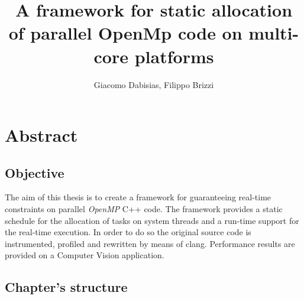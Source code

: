 \documentclass[a4paper,11pt,oneside]{book}
\author{Giacomo Dabisias, Filippo Brizzi}
\title{A framework for static allocation of parallel OpenMp code on multi-core platforms}
\begin{document}
\frontmatter
\tableofcontents

\chapter{Abstract}

\section{Objective}
The aim of this thesis is to create a framework for guaranteeing real-time constraints on parallel \emph{OpenMP} C++ code. The framework provides a static schedule for the allocation of tasks on system threads and a run-time support for the real-time execution. In order to do so the original source code is instrumented, profiled and rewritten by means of clang. Performance results are provided on a Computer Vision application.

\section{Chapter's structure}


\mainmatter
\end{document}
